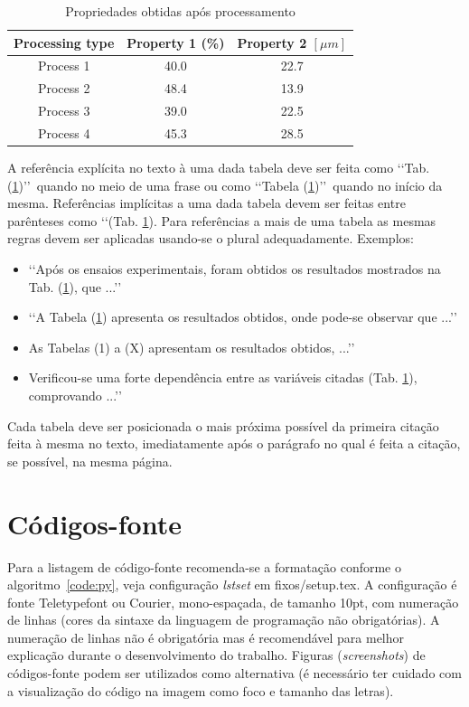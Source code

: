\begin{table}[hbt!]
	\centering
	\begin{tabular}{ccc}
		\toprule
		\textbf{Processing type} & \textbf{Property 1} (\%) & 
		\textbf{Property 2} $[\mu m]$ \\
		\midrule
		Process 1 & 40.0 & 22.7 \\
		Process 2 & 48.4 & 13.9 \\
		Process 3 & 39.0 & 22.5 \\
		Process 4 & 45.3 & 28.5 \\
		\bottomrule
	\end{tabular}
	\caption{Propriedades obtidas após processamento}
	\label{tab01}
\end{table}

A referência explícita no texto à uma dada tabela deve ser feita como \lq\lq Tab. (\ref{tab01})\rq\rq\ quando no meio de uma frase ou como \lq\lq Tabela (\ref{tab01})\rq\rq\ quando no início da mesma. Referências implícitas a uma dada tabela devem ser feitas entre parênteses como \lq\lq (Tab. \ref{tab01}). Para referências a mais de uma tabela as mesmas regras devem ser aplicadas usando-se o plural adequadamente. Exemplos:

\begin{itemize}
	\item \lq\lq Após os ensaios experimentais, foram obtidos os resultados 
	mostrados na Tab. (\ref{tab01}), que ...\rq\rq
	\item \lq\lq A Tabela (\ref{tab01}) apresenta os resultados obtidos, onde 
	pode-se observar que ...\rq\rq
	\item As Tabelas (1) a (X) apresentam os resultados obtidos, ...\rq\rq
	\item Verificou-se uma forte dependência entre as variáveis citadas 
	(Tab. \ref{tab01}), comprovando ...\rq\rq
\end{itemize}

Cada tabela deve ser posicionada o mais próxima possível da primeira citação 
feita à mesma no texto, imediatamente após o parágrafo no qual é feita a 
citação, se possível, na mesma página.


\section{Códigos-fonte}

Para a listagem de código-fonte recomenda-se a formatação conforme o algoritmo~\ref{code:py}, veja configuração \textit{lstset} em fixos/setup.tex. A configuração é fonte Teletypefont ou Courier, mono-espaçada, de tamanho 10pt, com numeração de linhas (cores da sintaxe da linguagem de programação não obrigatórias). A numeração de linhas não é obrigatória mas é recomendável para melhor explicação durante o desenvolvimento do trabalho. Figuras (\textit{screenshots}) de códigos-fonte podem ser utilizados como alternativa (é necessário ter cuidado com a visualização do código na imagem como foco e tamanho das letras).
\\

